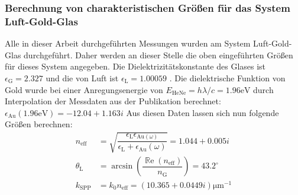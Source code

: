 \documentclass[titlepage]{article}
\renewcommand{\Re}{\operatorname{\mathbb{R}e}}
\begin{document}
	\subsubsection{Berechnung von charakteristischen Größen für das System Luft-Gold-Glas}
	Alle in dieser Arbeit durchgeführten Messungen wurden am System Luft-Gold-Glas durchgeführt. Daher werden an dieser Stelle die oben eingeführten Größen für dieses System angegeben. Die Dielektrizitätskonstante des Glases ist $\epsilon_{\mathrm{G}} = 2.327$ \cite{Zeiss.} und die von Luft ist $\epsilon_{\mathrm{L}} = 1.00059$ \cite{Hippel.1995}. Die dielektrische Funktion von Gold wurde bei einer Anregungsenergie von $E_{\mathrm{HeNe}} = h\lambda/c = 1.96\mathrm{eV} $ durch Interpolation der Messdaten aus der Publikation \cite{Olmon.2012} berechnet: $\epsilon_{\mathrm{Au}}(1.96\mathrm{eV}) = -12.04 +1.163i$ Aus diesen Daten lassen sich nun folgende Größen berechnen:
	\begin{subequations}
		\begin{align}
			n_{\mathrm{eff}} &= \sqrt{\dfrac{\epsilon_{\mathrm{L}}\epsilon_{\mathrm{Au}(\omega)}}{\epsilon_{\mathrm{L}} + 	\epsilon_{\mathrm{Au}}(\omega)}} = 	1.044 + 0.005i \label{eq:theo_n_eff}\\			
			\theta_\mathrm{L} &=  \arcsin\left(\dfrac{\Re(n_{\mathrm{eff}})}{ n_\mathrm{G}}\right) = 43.2^\circ 
			\label{eq:theo_theta_l}\\
			k_{\mathrm{SPP}} &= k_0 n_{\mathrm{eff}} = (10.365 + 0.0449i)\mathrm{\mu m}^{-1}\label{eq:theo_k_spp}
		\end{align}
	\end{subequations}
\end{document}
